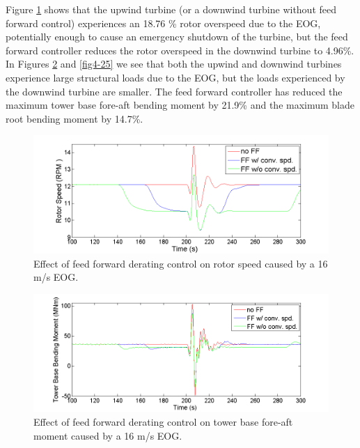 Figure \ref{fig4-23} shows that the upwind turbine (or a downwind turbine without feed forward control) experiences an 18.76 \% rotor overspeed due to the EOG, potentially enough to cause an emergency shutdown of the turbine, but the feed forward controller reduces the rotor overspeed in the downwind turbine to 4.96\%. In Figures \ref{fig4-24} and \ref{fig4-25} we see that both the upwind and downwind turbines experience large structural loads due to the EOG, but the loads experienced by the downwind turbine are smaller. The feed forward controller has reduced the maximum tower base fore-aft bending moment by 21.9\% and the maximum blade root bending moment by 14.7\%. 

\begin{figure}[htb]
	\centering
		\includegraphics[width = \linewidth]{Figures/ch4Figures/fig4-23.png}
		
	\caption{Effect of feed forward derating control on rotor speed caused by a 16 m/s EOG.}
	\label{fig4-23}
\end{figure}

\begin{figure}[htb]
	\centering
		\includegraphics[width = \linewidth]{Figures/ch4Figures/fig4-24.png}
		
	\caption{Effect of feed forward derating control on tower base fore-aft moment caused by a 16 m/s EOG.}
	\label{fig4-24}
\end{figure}

